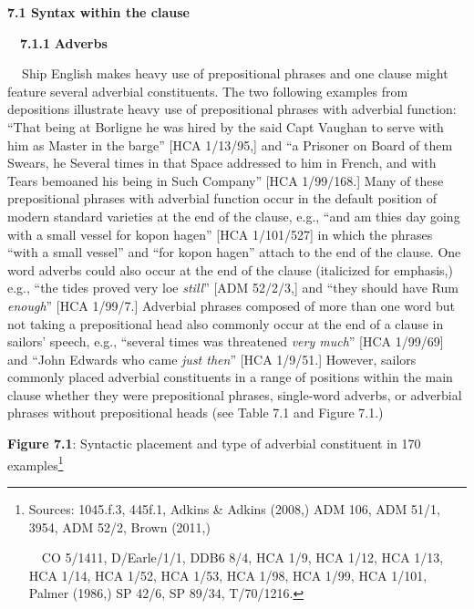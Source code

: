 \begin{styleStandard}
\textbf{7.1 Syntax within the clause}
\end{styleStandard}


\begin{styleStandard}
\ \ \textbf{7.1.1} \textbf{Adverbs}
\end{styleStandard}


\begin{styleStandard}
\textbf{\ \ }Ship English makes heavy use of prepositional phrases and one clause might feature several adverbial constituents. The two following examples from depositions illustrate heavy use of prepositional phrases with adverbial function: “That being at Borligne he was hired by the said Capt Vaughan to serve with him as Master in the barge” [HCA 1/13/95,] and “a Prisoner on Board of them Swears, he Several times in that Space addressed to him in French, and with Tears bemoaned his being in Such Company” [HCA 1/99/168.] Many of these prepositional phrases with adverbial function occur in the default position of modern standard varieties at the end of the clause, e.g., “and am thies day going with a small vessel for kopon hagen” [HCA 1/101/527] in which the phrases “with a small vessel” and “for kopon hagen” attach to the end of the clause. One word adverbs could also occur at the end of the clause (italicized for emphasis,) e.g., “the tides proved very loe \textit{still}” [ADM 52/2/3,] and “they should have Rum \textit{enough}” [HCA 1/99/7.] Adverbial phrases composed of more than one word but not taking a prepositional head also commonly occur at the end of a clause in sailors’ speech, e.g., “several times was threatened \textit{very much}” [HCA 1/99/69] and “John Edwards who came \textit{just then}” [HCA 1/9/51.] However, sailors commonly placed adverbial constituents in a range of positions within the main clause whether they were prepositional phrases, single-word adverbs, or adverbial phrases without prepositional heads (see Table 7.1 and Figure 7.1.) 
\end{styleStandard}


\begin{styleStandard}
  [Warning: Image ignored] %
 
\end{styleStandard}


\begin{styleStandard}
\textbf{Figure 7.1}: Syntactic placement and type of adverbial constituent in 170 examples\footnote{ Sources: 1045.f.3, 445f.1, Adkins \& Adkins (2008,) ADM 106, ADM 51/1, 3954, ADM 52/2, Brown (2011,) \par \ \ CO 5/1411, D/Earle/1/1, DDB6 8/4, HCA 1/9, HCA 1/12, HCA 1/13, HCA 1/14, HCA 1/52, HCA 1/53, HCA 1/98, HCA 1/99, HCA 1/101, Palmer (1986,) SP 42/6, SP 89/34, T/70/1216.}
\end{styleStandard}


